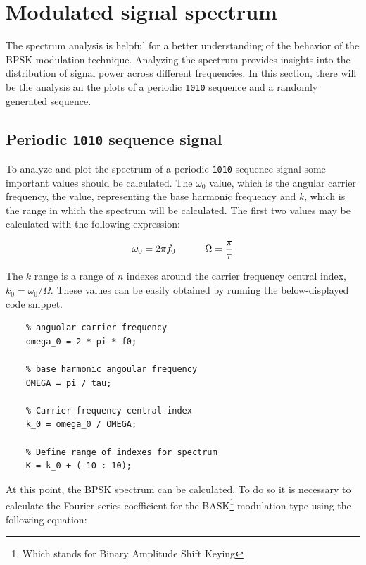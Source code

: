\vspace{40px} \section{Modulated signal spectrum}
The spectrum analysis is helpful for a better understanding of the behavior of the BPSK modulation technique. Analyzing the spectrum provides insights into the distribution of signal power across different frequencies. In this section, there will be the analysis an the plots of a periodic \texttt{1010} sequence and a randomly generated sequence.



\subsection{Periodic \texttt{1010} sequence signal}
To analyze and plot the spectrum of a periodic \texttt{1010} sequence signal some important values should be calculated. The $\omega_0$ value, which is the angular carrier frequency, the value, representing the base harmonic frequency and $k$, which is the range in which the spectrum will be calculated. The first two values may be calculated with the following expression:

\begin{equation*}
    \omega_0 = 2\pi f_0 \hspace{30px} \Omega = \frac{\pi}{\tau}
\end{equation*}

\noindent The $k$ range is a range of $n$ indexes around the carrier frequency central index, $k_0 = \omega_0 / \Omega$. These values can be easily obtained by running the below-displayed code snippet.

\begin{lstlisting}
    % anguolar carrier frequency
    omega_0 = 2 * pi * f0; 

    % base harmonic angoular frequency 
    OMEGA = pi / tau; 

    % Carrier frequency central index
    k_0 = omega_0 / OMEGA;

    % Define range of indexes for spectrum
    K = k_0 + (-10 : 10);
\end{lstlisting}

\noindent At this point, the BPSK spectrum can be calculated. To do so it is necessary to calculate the Fourier series coefficient for the BASK\footnote{Which stands for Binary Amplitude Shift Keying} modulation type using the following equation:

